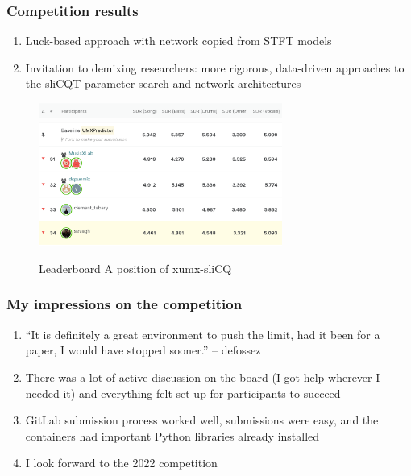\documentclass[usenames,dvipsnames]{beamer}
\begin{document}
\begin{frame}
	\frametitle{Competition results}
	\begin{enumerate}
	\item
		Luck-based approach with network copied from STFT models
	\item
		Invitation to demixing researchers: more rigorous, data-driven approaches to the sliCQT parameter search and network architectures
	\end{enumerate}
	\begin{figure}[ht]
		\centering
		\includegraphics[width=8cm]{./images-misc/leaderboard_header.png}\\
		\vspace{-0.25em}
		\includegraphics[width=8cm]{./images-misc/leaderboard_myplace.png}
		\caption{Leaderboard A position of xumx-sliCQ}
		\vspace{-1em}
	\end{figure}

\end{frame}

\begin{frame}
	\frametitle{My impressions on the competition}
	\begin{enumerate}
	\item
	 ``It is definitely a great environment to push the limit, had it been for a paper, I would have stopped sooner.'' -- defossez
	 \item
		 There was a lot of active discussion on the board (I got help wherever I needed it) and everything felt set up for participants to succeed
	 \item
		 GitLab submission process worked well, submissions were easy, and the containers had important Python libraries already installed
	 \item
		 I look forward to the 2022 competition
	\end{enumerate}
\end{frame}
\end{document}
